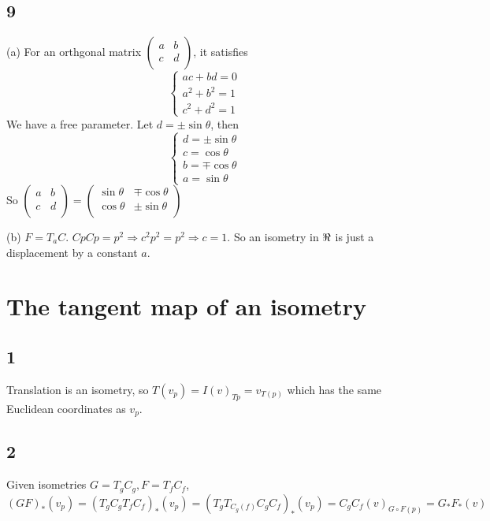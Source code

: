 \documentclass[12pt]{article}
\begin{document}
\subsection*{9}
(a) For an orthgonal matrix $\begin{pmatrix}
	a & b \\ c& d \\
\end{pmatrix}$, it satisfies 
$$\begin{cases}
	ac + bd = 0 \\
	a^2 + b^2 = 1 \\
	c^2 + d^2 = 1 
\end{cases}$$
We have a free parameter. Let $d = \pm \sin \theta$, then $$ \begin{cases}
	d = \pm \sin \theta \\
	c = \cos\theta\\
	b = \mp \cos\theta \\
	a = \sin\theta 
\end{cases} $$
So $\begin{pmatrix}
	a & b \\ c& d \\
\end{pmatrix} = \begin{pmatrix}
\sin\theta & \mp \cos\theta \\ \cos\theta&  \pm \sin\theta \\
\end{pmatrix}$

(b) $F = T_a C$. $Cp Cp = p^2 \Rightarrow c^2 p^2 = p^2 \Rightarrow c = 1$. So an isometry in $\real$ is just a displacement by a constant $a$.

\section{The tangent map of an isometry}
\subsection*{1}
Translation is an isometry, so $T(v_p) = I(v)_{T{p}} = v_{T(p)}$ which has the same Euclidean coordinates as $v_p$.

\subsection*{2}
Given isometries $G=T_gC_g, F=T_fC_f $,  $(GF)_*(v_p) = (T_gC_gT_fC_f)_*(v_p) = (T_gT_{C_g(f)} C_g C_f)_*(v_p) = C_g C_f (v)_{G\circ F(p)} = G_* F_* (v) $
\end{document}
